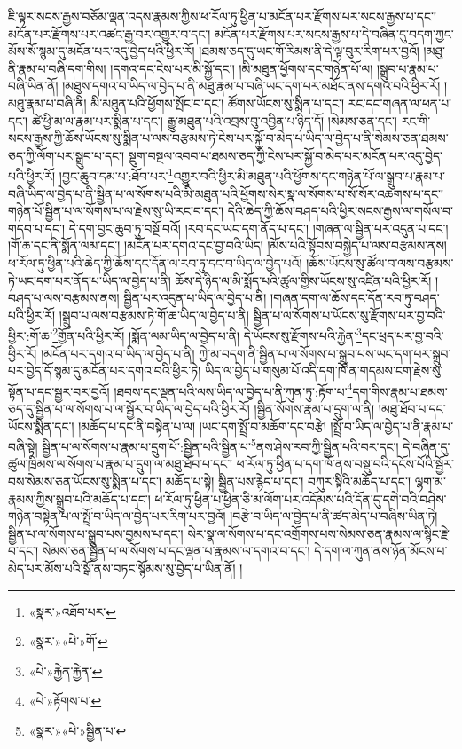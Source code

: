 ཇི་ལྟར་སངས་རྒྱས་བཅོམ་ལྡན་འདས་རྣམས་ཀྱིས་ཕ་རོལ་ཏུ་ཕྱིན་པ་མངོན་པར་རྫོགས་པར་སངས་རྒྱས་པ་དང་། མངོན་པར་རྫོགས་པར་འཚང་རྒྱ་བར་འགྱུར་བ་དང་། མངོན་པར་རྫོགས་པར་སངས་རྒྱས་པ་དེ་བཞིན་དུ་བདག་ཀྱང་མོས་སོ་སྙམ་དུ་མངོན་པར་འདུ་བྱེད་པའི་ཕྱིར་རོ། །ཐམས་ཅད་དུ་ཡང་གོ་རིམས་ནི་དེ་ལྟ་བུར་རིག་པར་བྱའོ། །མཐུ་ནི་རྣམ་པ་བཞི་དག་གིས། །དགའ་དང་ངེས་པར་མི་སྐྱོ་དང་། །མི་མཐུན་ཕྱོགས་དང་གཉེན་པོ་ལ། །སྒྲུབ་པ་རྣམ་པ་བཞི་ཡིན་ནོ། །མཐུས་དགའ་བ་ཡིད་ལ་བྱེད་པ་ནི་མཐུ་རྣམ་པ་བཞི་ཡང་དག་པར་མཐོང་ནས་དགའ་བའི་ཕྱིར་རོ། །མཐུ་རྣམ་པ་བཞི་ནི། མི་མཐུན་པའི་ཕྱོགས་སྤོང་བ་དང་། ཚོགས་ཡོངས་སུ་སྨིན་པ་དང་། རང་དང་གཞན་ལ་ཕན་པ་དང་། ཚེ་ཕྱི་མ་ལ་རྣམ་པར་སྨིན་པ་དང་། རྒྱུ་མཐུན་པའི་འབྲས་བུ་འབྱིན་པ་ཉིད་དོ། །སེམས་ཅན་དང་། རང་གི་སངས་རྒྱས་ཀྱི་ཆོས་ཡོངས་སུ་སྨིན་པ་ལས་བརྩམས་ཏེ་ངེས་པར་སྐྱོ་བ་མེད་པ་ཡིད་ལ་བྱེད་པ་ནི་སེམས་ཅན་ཐམས་ཅད་ཀྱི་ལོག་པར་སྒྲུབ་པ་དང་། སྡུག་བསྔལ་འབབ་པ་ཐམས་ཅད་ཀྱི་ངེས་པར་སྐྱོ་བ་མེད་པར་མངོན་པར་འདུ་བྱེད་པའི་ཕྱིར་རོ། །བྱང་ཆུབ་དམ་པ་:ཐོབ་པར་\footnote{«སྣར་»འཐོབ་པར་}འགྱུར་བའི་ཕྱིར་མི་མཐུན་པའི་ཕྱོགས་དང་གཉེན་པོ་ལ་སྒྲུབ་པ་རྣམ་པ་བཞི་ཡིད་ལ་བྱེད་པ་ནི་སྦྱིན་པ་ལ་སོགས་པའི་མི་མཐུན་པའི་ཕྱོགས་སེར་སྣ་ལ་སོགས་པ་སོ་སོར་འཆགས་པ་དང་། གཉེན་པོ་སྦྱིན་པ་ལ་སོགས་པ་ལ་རྗེས་སུ་ཡི་རང་བ་དང་། དེའི་ཆེད་ཀྱི་ཆོས་བཤད་པའི་ཕྱིར་སངས་རྒྱས་ལ་གསོལ་བ་གདབ་པ་དང་། དེ་དག་བྱང་ཆུབ་ཏུ་བསྔོ་བའོ། །རབ་དང་ཡང་དག་ནོད་པ་དང་། །གཞན་ལ་སྦྱིན་པར་འདུན་པ་དང་། །གོ་ཆ་དང་ནི་སྨོན་ལམ་དང་། །མངོན་པར་དགའ་དང་བྱ་བའི་ཡིད། །མོས་པའི་སྟོབས་བསྐྱེད་པ་ལས་བརྩམས་ནས། ཕ་རོལ་ཏུ་ཕྱིན་པའི་ཆེད་ཀྱི་ཆོས་དང་དོན་ལ་རབ་ཏུ་དང་བ་ཡིད་ལ་བྱེད་པའོ། །ཆོས་ཡོངས་སུ་ཚོལ་བ་ལས་བརྩམས་ཏེ་ཡང་དག་པར་ནོད་པ་ཡིད་ལ་བྱེད་པ་ནི། ཆོས་དེ་ཉིད་ལ་མི་སྨོད་པའི་ཚུལ་གྱིས་ཡོངས་སུ་འཛིན་པའི་ཕྱིར་རོ། །བཤད་པ་ལས་བརྩམས་ནས། སྦྱིན་པར་འདུན་པ་ཡིད་ལ་བྱེད་པ་ནི། །གཞན་དག་ལ་ཆོས་དང་དོན་རབ་ཏུ་བཤད་པའི་ཕྱིར་རོ། །སྒྲུབ་པ་ལས་བརྩམས་ཏེ་གོ་ཆ་ཡིད་ལ་བྱེད་པ་ནི། སྦྱིན་པ་ལ་སོགས་པ་ཡོངས་སུ་རྫོགས་པར་བྱ་བའི་ཕྱིར་:གོ་ཆ་\footnote{«སྣར་»«པེ་»གོ་}གྱོན་པའི་ཕྱིར་རོ། །སྨོན་ལམ་ཡིད་ལ་བྱེད་པ་ནི། དེ་ཡོངས་སུ་རྫོགས་པའི་རྐྱེན་\footnote{«པེ་»རྐྱེན་རྐྱེན་}དང་ཕྲད་པར་བྱ་བའི་ཕྱིར་རོ། །མངོན་པར་དགའ་བ་ཡིད་ལ་བྱེད་པ་ནི། ཀྱེ་མ་བདག་ནི་སྦྱིན་པ་ལ་སོགས་པ་སྒྲུབ་པས་ཡང་དག་པར་སྒྲུབ་པར་བྱེད་དོ་སྙམ་དུ་མངོན་པར་དགའ་བའི་ཕྱིར་ཏེ། ཡིད་ལ་བྱེད་པ་གསུམ་པོ་འདི་དག་ཁོ་ན་གདམས་ངག་རྗེས་སུ་སྟོན་པ་དང་སྦྱར་བར་བྱའོ། །ཐབས་དང་ལྡན་པའི་ལས་ཡིད་ལ་བྱེད་པ་ནི་ཀུན་ཏུ་:རྟོག་པ་\footnote{«པེ་»རྟོགས་པ་}དག་གིས་རྣམ་པ་ཐམས་ཅད་དུ་སྦྱིན་པ་ལ་སོགས་པ་ལ་སྦྱོར་བ་ཡིད་ལ་བྱེད་པའི་ཕྱིར་རོ། །སྦྱིན་སོགས་རྣམ་པ་དྲུག་ལ་ནི། །མཐུ་ཐོབ་པ་དང་ཡོངས་སྨིན་དང་། །མཆོད་པ་དང་ནི་བསྟེན་པ་ལ། །ཡང་དག་སྤྲོ་བ་མཆོག་དང་བརྩེ། །སྤྲོ་བ་ཡིད་ལ་བྱེད་པ་ནི་རྣམ་པ་བཞི་སྟེ། སྦྱིན་པ་ལ་སོགས་པ་རྣམ་པ་དྲུག་པོ་:སྦྱིན་པའི་སྦྱིན་པ་\footnote{«སྣར་»«པེ་»སྦྱིན་པ་}ནས་ཤེས་རབ་ཀྱི་སྦྱིན་པའི་བར་དང་། དེ་བཞིན་དུ་ཚུལ་ཁྲིམས་ལ་སོགས་པ་རྣམ་པ་དྲུག་ལ་མཐུ་ཐོབ་པ་དང་། ཕ་རོལ་ཏུ་ཕྱིན་པ་དག་ཁོ་ནས་བསྡུ་བའི་དངོས་པོའི་སྦྱོར་བས་སེམས་ཅན་ཡོངས་སུ་སྨིན་པ་དང་། མཆོད་པ་སྟེ། སྦྱིན་པས་རྙེད་པ་དང་། བཀུར་སྟིའི་མཆོད་པ་དང་། ལྷག་མ་རྣམས་ཀྱིས་སྒྲུབ་པའི་མཆོད་པ་དང་། ཕ་རོལ་ཏུ་ཕྱིན་པ་ཕྱིན་ཅི་མ་ལོག་པར་འདོམས་པའི་དོན་དུ་དགེ་བའི་བཤེས་གཉེན་བསྟེན་པ་ལ་སྤྲོ་བ་ཡིད་ལ་བྱེད་པར་རིག་པར་བྱའོ། །བརྩེ་བ་ཡིད་ལ་བྱེད་པ་ནི་ཚད་མེད་པ་བཞིས་ཡིན་ཏེ། སྦྱིན་པ་ལ་སོགས་པ་སྒྲུབ་པས་བྱམས་པ་དང་། སེར་སྣ་ལ་སོགས་པ་དང་འགྲོགས་པས་སེམས་ཅན་རྣམས་ལ་སྙིང་རྗེ་བ་དང་། སེམས་ཅན་སྦྱིན་པ་ལ་སོགས་པ་དང་ལྡན་པ་རྣམས་ལ་དགའ་བ་དང་། དེ་དག་ལ་ཀུན་ནས་ཉོན་མོངས་པ་མེད་པར་མོས་པའི་སྒོ་ནས་བཏང་སྙོམས་སུ་བྱེད་པ་ཡིན་ནོ། །

